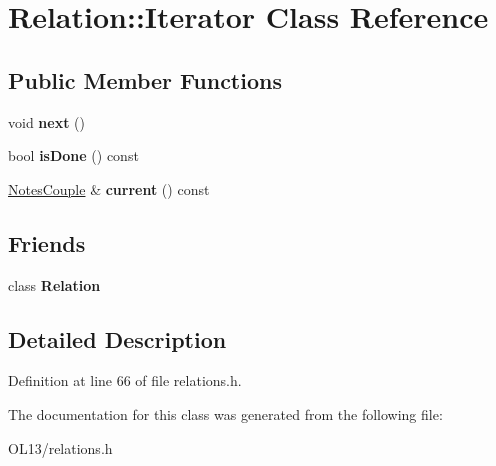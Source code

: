 \hypertarget{class_relation_1_1_iterator}{}\section{Relation\+:\+:Iterator Class Reference}
\label{class_relation_1_1_iterator}
\subsection*{Public Member Functions}
\begin{DoxyCompactItemize}
\item 
\mbox{\label{class_relation_1_1_iterator_a8ff276d2d33755160725b5dbc4a95a72}} 
void {\bfseries next} ()
\item 
\mbox{\label{class_relation_1_1_iterator_ac99e741753998f6c314c3b7884d4dd44}} 
bool {\bfseries is\+Done} () const
\item 
\mbox{\label{class_relation_1_1_iterator_a4d68e76ae0fbe22f025ee747218beb26}} 
\hyperlink{class_notes_couple}{Notes\+Couple} \& {\bfseries current} () const
\end{DoxyCompactItemize}
\subsection*{Friends}
\begin{DoxyCompactItemize}
\item 
\mbox{\label{class_relation_1_1_iterator_a7ee004262f27f8c916688911a71e3aa1}} 
class {\bfseries Relation}
\end{DoxyCompactItemize}


\subsection{Detailed Description}


Definition at line 66 of file relations.\+h.



The documentation for this class was generated from the following file\+:\begin{DoxyCompactItemize}
\item 
O\+L13/relations.\+h\end{DoxyCompactItemize}
